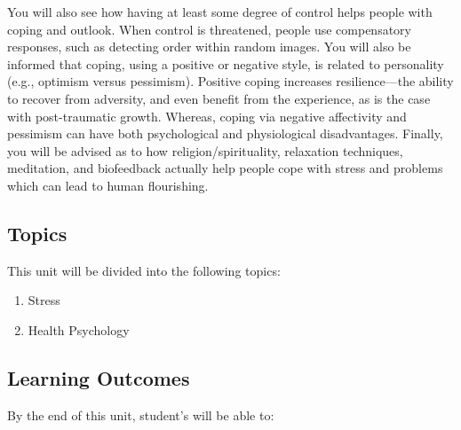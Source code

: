 \documentclass[
]{book}
\providecommand{\tightlist}{%
  \setlength{\itemsep}{0pt}\setlength{\parskip}{0pt}}
\begin{document}
You will also see how having at least some degree of control helps people with coping and outlook. When control is threatened, people use compensatory responses, such as detecting order within random images. You will also be informed that coping, using a positive or negative style, is related to personality (e.g., optimism versus pessimism). Positive coping increases resilience---the ability to recover from adversity, and even benefit from the experience, as is the case with post-traumatic growth. Whereas, coping via negative affectivity and pessimism can have both psychological and physiological disadvantages. Finally, you will be advised as to how religion/spirituality, relaxation techniques, meditation, and biofeedback actually help people cope with stress and problems which can lead to human flourishing.

\hypertarget{topics-8}{%
\subsection*{Topics}\label{topics-8}}

This unit will be divided into the following topics:

\begin{enumerate}
\def\labelenumi{\arabic{enumi}.}
\tightlist
\item
  Stress\\
\item
  Health Psychology
\end{enumerate}

\hypertarget{learning-outcomes-8}{%
\subsection*{Learning Outcomes}\label{learning-outcomes-8}}

By the end of this unit, student's will be able to:
\end{document}
